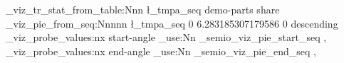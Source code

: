 \documentclass{article}
\begin{document}
\ExplSyntaxOn
{}
\semio_viz_tr_stat_from_table:Nnn \l_tmpa_seq { demo-parts } { share }
\semio_viz_pie_from_seq:Nnnnn \l_tmpa_seq { 0 } { 6.283185307179586 } { 0 } { descending }
\semio_viz_probe_values:nx { start-angle } { \seq_use:Nn \g_semio_viz_pie_start_seq { , } }
\semio_viz_probe_values:nx { end-angle } { \seq_use:Nn \g_semio_viz_pie_end_seq { , } }
\ExplSyntaxOff
\end{document}
